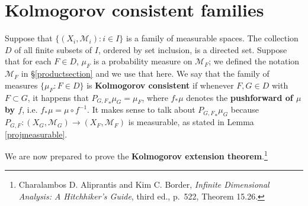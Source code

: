 \documentclass{article}
\theoremstyle{definition}
\begin{document}
\section{Kolmogorov consistent families}
Suppose that $\{(X_i,\mathscr{M}_i): i \in I\}$ is a family of measurable spaces. 
The collection $D$ of all finite subsets of $I$, ordered by set
inclusion, is a directed set.
Suppose that for each $F \in D$,
$\mu_F$ is a probability measure on $\mathscr{M}_F$; we defined the notation $\mathscr{M}_F$ in \S \ref{productsection} and we use that here.
 We say that the family of measures $\{\mu_F: F \in D\}$ is \textbf{Kolmogorov consistent} if whenever $F,G \in D$
with $F \subset G$, it happens that ${P_{G,F}}_* \mu_G = \mu_F$, where $f_* \mu$ denotes the \textbf{pushforward of
$\mu$ by $f$}, i.e. $f_* \mu = \mu \circ f^{-1}$. It makes sense to talk about ${P_{G,F}}_* \mu_G$ because
$P_{G,F}:(X_G,\mathscr{M}_G) \to (X_F,\mathscr{M}_F)$ is measurable, as stated in Lemma \ref{projmeasurable}.

We are now prepared to prove the \textbf{Kolmogorov extension theorem}.\footnote{Charalambos D. Aliprantis and Kim C. Border, {\em Infinite Dimensional Analysis: A Hitchhiker's Guide}, third ed., p.~522,
Theorem 15.26.}
\end{document}
